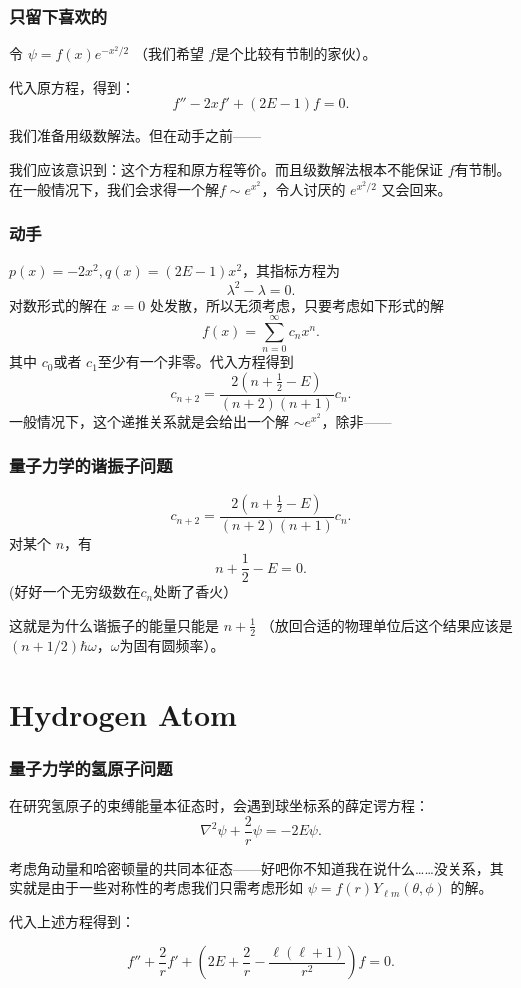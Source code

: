 \documentclass[CJK]{beamer}
\begin{document}
\begin{frame}
  \frametitle{只留下喜欢的}
  令 $\psi = f(x) e^{-x^2/2}$ （我们希望 $f$是个比较有节制的家伙）。

  代入原方程，得到：
  $$f''-2xf'+(2E-1)f = 0. $$

  我们准备用级数解法。但在动手之前——
  
  我们应该意识到：这个方程和原方程等价。而且级数解法根本不能保证 $f$有节制。在一般情况下，我们会求得一个解$f\sim e^{x^2}$，令人讨厌的 $e^{x^2/2}$ 又会回来。
\end{frame}


\begin{frame}
  \frametitle{动手}
  $p(x)= -2x^2, q(x) = (2E-1)x^2$，其指标方程为
  $$\lambda^2-\lambda = 0.$$
  对数形式的解在 $x=0$ 处发散，所以无须考虑，只要考虑如下形式的解
  $$ f(x) = \sum_{n=0}^\infty c_n x^n.$$
  其中 $c_0$或者 $c_1$至少有一个非零。代入方程得到
  $$ c_{n+2} =  \frac{2\left(n+\frac{1}{2}-E\right)}{(n+2)(n+1)}c_n.$$
  一般情况下，这个递推关系就是会给出一个解 $\sim e^{x^2}$，除非——
\end{frame}


\begin{frame}
  \frametitle{量子力学的谐振子问题}
  $$ c_{n+2} =  \frac{2\left(n+\frac{1}{2}-E\right)}{(n+2)(n+1)}c_n.$$
   对某个 $n$，有
  $$ n+\frac{1}{2}-E=0.$$
  (好好一个无穷级数在$c_n$处断了香火）

    \skipline

  这就是为什么谐振子的能量只能是 $n+\frac{1}{2}$ （放回合适的物理单位后这个结果应该是 $(n+1/2)\hbar\omega$，$\omega$为固有圆频率）。
\end{frame}

\section{Hydrogen Atom}


\begin{frame}
  \frametitle{量子力学的氢原子问题}
  在研究氢原子的束缚能量本征态时，会遇到球坐标系的薛定谔方程：
  $$ \nabla^2\psi + \frac{2}{r}\psi = -2E\psi.$$

  考虑角动量和哈密顿量的共同本征态——好吧你不知道我在说什么……没关系，其实就是由于一些对称性的考虑我们只需考虑形如 $ \psi = f(r)Y_{\ell m}(\theta,\phi) $ 的解。

  代入上述方程得到：

  $$ f''+ \frac{2}{r}f' + \left(2E+\frac{2}{r}- \frac{\ell(\ell+1)}{r^2}\right)f = 0.$$
\end{frame}
\end{document}
